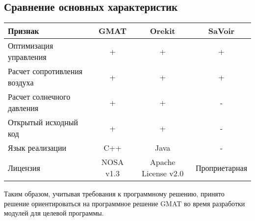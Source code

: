 \subsection{Сравнение основных характеристик}
\begin{tabular}{|l|c|c|c|}
  \hline
  Признак                      & GMAT                            & Orekit              & SaVoir \\ \hline
  Оптимизация управления       & +                               & +                   & +      \\ \hline
  Расчет сопротивления воздуха & +                               & +                   & +      \\ \hline
  Расчет солнечного давления   & +                               & +                   & -      \\ \hline
  Открытый исходный код        & +                               & +                   & -      \\ \hline
  Язык реализации              & C++                             & Java                & -      \\ \hline
  Лицензия                     & NOSA v1.3 & Apache License v2.0 & Проприетарная \\ \hline
\end{tabular}\par
Таким образом, учитывая требования к программному решению, принято решение
ориентироваться на программное решение GMAT во время разработки модулей для целевой программы.
